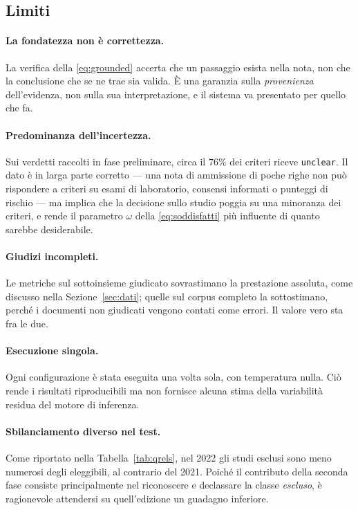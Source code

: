 \documentclass[pdflatex,sn-mathphys-num]{sn-jnl}
\theoremstyle{thmstyleone}
\theoremstyle{thmstyletwo}
\theoremstyle{thmstylethree}
\begin{document}
\subsection{Limiti}\label{sec:disc-limiti}

\paragraph{La fondatezza non è correttezza.} La verifica della \eqref{eq:grounded} accerta che un passaggio esista nella nota, non che la conclusione che se ne trae sia valida. È una garanzia sulla \emph{provenienza} dell'evidenza, non sulla sua interpretazione, e il sistema va presentato per quello che fa.

\paragraph{Predominanza dell'incertezza.} Sui verdetti raccolti in fase preliminare, circa il $76\%$ dei criteri riceve \texttt{unclear}. Il dato è in larga parte corretto --- una nota di ammissione di poche righe non può rispondere a criteri su esami di laboratorio, consensi informati o punteggi di rischio --- ma implica che la decisione sullo studio poggia su una minoranza dei criteri, e rende il parametro $\omega$ della \eqref{eq:soddisfatti} più influente di quanto sarebbe desiderabile.

\paragraph{Giudizi incompleti.} Le metriche sul sottoinsieme giudicato sovrastimano la prestazione assoluta, come discusso nella Sezione~\ref{sec:dati}; quelle sul corpus completo la sottostimano, perché i documenti non giudicati vengono contati come errori. Il valore vero sta fra le due.

\paragraph{Esecuzione singola.} Ogni configurazione è stata eseguita una volta sola, con temperatura nulla. Ciò rende i risultati riproducibili ma non fornisce alcuna stima della variabilità residua del motore di inferenza.

\paragraph{Sbilanciamento diverso nel test.} Come riportato nella Tabella~\ref{tab:qrels}, nel 2022 gli studi esclusi sono meno numerosi degli eleggibili, al contrario del 2021. Poiché il contributo della seconda fase consiste principalmente nel riconoscere e declassare la classe \emph{escluso}, è ragionevole attendersi su quell'edizione un guadagno inferiore.
\end{document}
